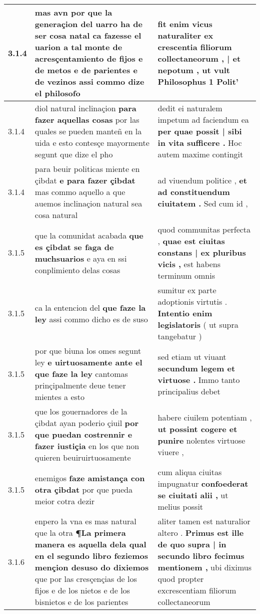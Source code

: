 \begin{tabular}{|p{1cm}|p{6.5cm}|p{6.5cm}|}
3.1.4 & mas avn por que la generaçion del uarro ha de ser cosa natal \textbf{ ca fazesse el uarion a tal monte de acresçentamiento de fijos e de metos e de parientes e de vezinos } assi commo dize el philosofo & fit enim vicus naturaliter \textbf{ ex crescentia filiorum collectaneorum , | et nepotum , } ut vult Philosophus 1 Polit’ \\\hline
3.1.4 & diol natural inclinaçion \textbf{ para fazer aquellas cosas } por las quales se pueden manteñ en la uida e esto contesçe mayormente segunt que dize el pho & dedit ei naturalem impetum ad faciendum ea \textbf{ per quae possit | sibi in vita sufficere . } Hoc autem maxime contingit \\\hline
3.1.4 & para beuir politicas miente en çibdat \textbf{ e para fazer çibdat } mas commo aquello a que auemos inclinaçion natural sea cosa natural & ad viuendum politice , \textbf{ et ad constituendum ciuitatem . } Sed cum id , \\\hline
3.1.5 & que la comunidat acabada \textbf{ que es çibdat se faga de muchsuarios } e aya en ssi conplimiento delas cosas & quod communitas perfecta , \textbf{ quae est ciuitas constans | ex pluribus vicis , } est habens terminum omnis \\\hline
3.1.5 & ca la entencion del \textbf{ que faze la ley } assi commo dicho es de suso & sumitur ex parte adoptionis virtutis . \textbf{ Intentio enim legislatoris } ( ut supra tangebatur ) \\\hline
3.1.5 & por que biuna los omes segunt ley \textbf{ e uirtuosamente ante el que faze la ley } cantomas prinçipalmente deue tener mientes a esto & sed etiam ut viuant \textbf{ secundum legem et virtuose . } Immo tanto principalius debet \\\hline
3.1.5 & que los gouernadores de la çibdat ayan poderio çiuil \textbf{ por que puedan costrennir e fazer iustiçia } en los que non quieren beuiruirtuosamente & habere ciuilem potentiam , \textbf{ ut possint cogere et punire } nolentes virtuose viuere , \\\hline
3.1.5 & enemigos \textbf{ faze amistança con otra çibdat } por que pueda meior cotra dezir & cum aliqua ciuitas impugnatur \textbf{ confoederat se ciuitati alii , } ut melius possit \\\hline
3.1.6 & enpero la vna es mas natural que la otra \textbf{ ¶La primera manera es aquella dela qual en el segundo libro feziemos mençion desuso do dixiemos } que por las cresçençias de los fijos e de los nietos e de los bisnietos e de los parientes & aliter tamen est naturalior altero . \textbf{ Primus est ille de quo supra | in secundo libro fecimus mentionem , } ubi diximus quod propter excrescentiam filiorum collectaneorum \\\hline

\end{tabular}
